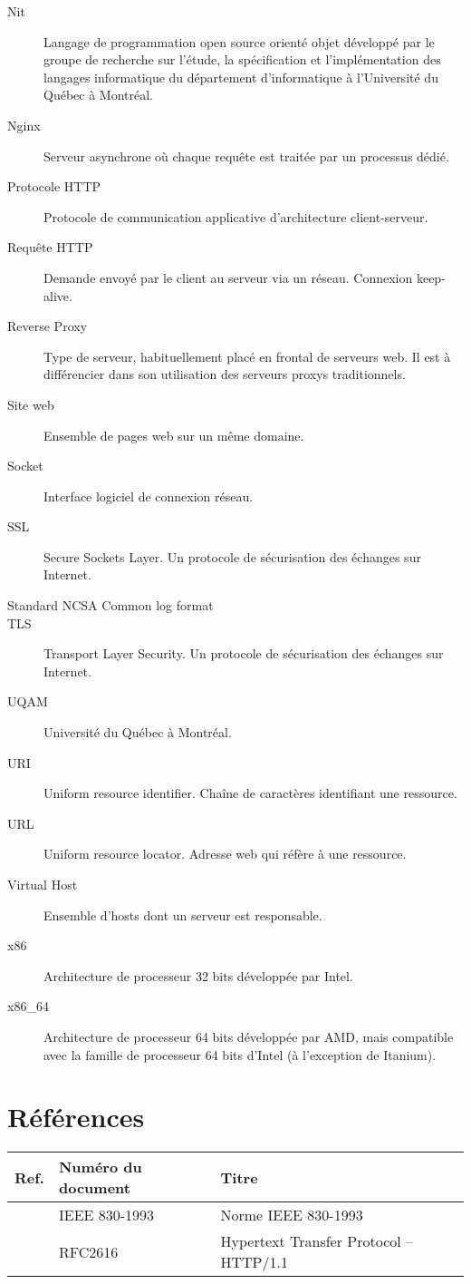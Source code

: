 \documentclass{scrreprt}
\begin{document}
\begin{description}
	\item[Nit] Langage de programmation open source orienté objet développé par le
groupe de recherche sur l'étude, la spécification et l'implémentation des
langages informatique du département d'informatique à l'Université du Québec à
Montréal.
	\item[Nginx] Serveur asynchrone où chaque requête est traitée par un processus dédié.   
	\item[Protocole HTTP] Protocole de communication applicative d'architecture
client-serveur\cite{http}.
	\item[Requête HTTP] Demande envoyé par le client au serveur via un réseau.
Connexion keep-alive\cite{http1.0}.
	\item[Reverse Proxy] Type de serveur, habituellement placé en frontal de serveurs web. Il est à différencier dans son utilisation des serveurs proxys traditionnels.
    \item[Site web] Ensemble de pages web sur un même domaine.
	\item[Socket] Interface logiciel de connexion réseau.   
    \item[SSL] Secure Sockets Layer. Un protocole de sécurisation des échanges sur Internet.
	\item[Standard NCSA Common log format]  
    \item[TLS] Transport Layer Security. Un protocole de sécurisation des échanges sur Internet. 
    \item[UQAM] Université du Québec à Montréal.    
    \item[URI] Uniform resource identifier. Chaîne de caractères identifiant une ressource.
    \item[URL] Uniform resource locator. Adresse web qui réfère à une ressource.
    \item[Virtual Host] Ensemble d'hosts dont un serveur est responsable.
    \item[x86] Architecture de processeur 32 bits développée par Intel.
    \item[x86_64] Architecture de processeur 64 bits développée par AMD, mais compatible avec la famille de processeur 64 bits d'Intel (à l'exception de Itanium).

\end{description}

\section{Références}
\begin{tabularx}{\textwidth}{|l|X|l|}
    \hline
    Ref. & Numéro du document & Titre \\
    \hline
    \cite{ieefr} & IEEE 830-1993 & Norme IEEE 830-1993 \\
    \hline
    \cite{http} & RFC2616 & Hypertext Transfer Protocol -- HTTP/1.1 \\
    \hline
\end{tabularx}
\end{document}
